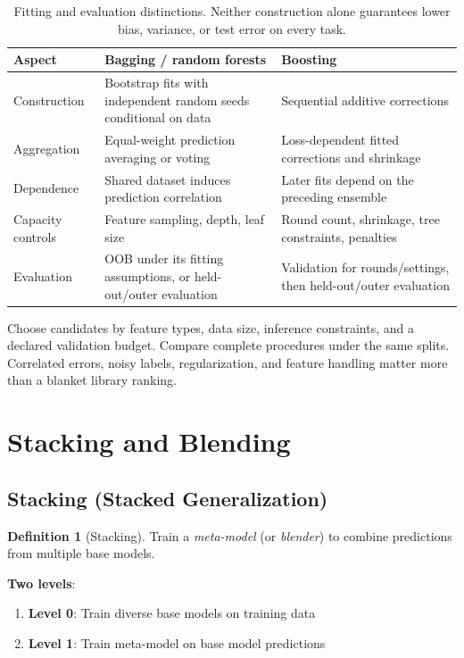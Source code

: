 \documentclass[11pt,twoside]{article}
\numberwithin{equation}{section}
\theoremstyle{plain}
\theoremstyle{definition}
\newtheorem{definition}[theorem]{Definition}
\theoremstyle{remark}
\begin{document}
\begin{table}[H]
\centering
\begin{tabular}{@{}p{3cm}p{5.2cm}p{5.2cm}@{}}
\toprule
Aspect & Bagging / random forests & Boosting\\\midrule
Construction & Bootstrap fits with independent random seeds conditional on data & Sequential additive corrections\\
Aggregation & Equal-weight prediction averaging or voting & Loss-dependent fitted corrections and shrinkage\\
Dependence & Shared dataset induces prediction correlation & Later fits depend on the preceding ensemble\\
Capacity controls & Feature sampling, depth, leaf size & Round count, shrinkage, tree constraints, penalties\\
Evaluation & OOB under its fitting assumptions, or held-out/outer evaluation & Validation for rounds/settings, then held-out/outer evaluation\\
\bottomrule\end{tabular}
\caption{Fitting and evaluation distinctions. Neither construction alone guarantees lower bias, variance, or test error on every task.}
\end{table}

Choose candidates by feature types, data size, inference constraints, and a declared validation budget. Compare complete procedures under the same splits. Correlated errors, noisy labels, regularization, and feature handling matter more than a blanket library ranking.

\section{Stacking and Blending}
\label{sec:stacking}

\subsection{Stacking (Stacked Generalization)}

\begin{definition}[Stacking]
Train a \emph{meta-model} (or \emph{blender}) to combine predictions from multiple base models.

\textbf{Two levels}:
\begin{enumerate}
\item \textbf{Level 0}: Train diverse base models on training data
\item \textbf{Level 1}: Train meta-model on base model predictions
\end{enumerate}
\end{definition}
\end{document}
